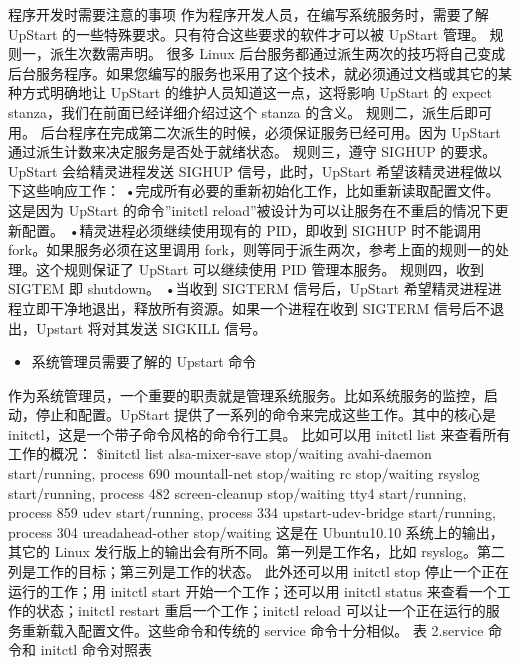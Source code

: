 \documentclass[a4paper,10pt,english]{sphinxmanual}
\begin{document}
程序开发时需要注意的事项
作为程序开发人员，在编写系统服务时，需要了解 UpStart 的一些特殊要求。只有符合这些要求的软件才可以被 UpStart 管理。
规则一，派生次数需声明。
很多 Linux 后台服务都通过派生两次的技巧将自己变成后台服务程序。如果您编写的服务也采用了这个技术，就必须通过文档或其它的某种方式明确地让 UpStart 的维护人员知道这一点，这将影响 UpStart 的 expect stanza，我们在前面已经详细介绍过这个 stanza 的含义。
规则二，派生后即可用。
后台程序在完成第二次派生的时候，必须保证服务已经可用。因为 UpStart 通过派生计数来决定服务是否处于就绪状态。
规则三，遵守 SIGHUP 的要求。
UpStart 会给精灵进程发送 SIGHUP 信号，此时，UpStart 希望该精灵进程做以下这些响应工作：
•完成所有必要的重新初始化工作，比如重新读取配置文件。这是因为 UpStart 的命令”initctl reload”被设计为可以让服务在不重启的情况下更新配置。
•精灵进程必须继续使用现有的 PID，即收到 SIGHUP 时不能调用 fork。如果服务必须在这里调用 fork，则等同于派生两次，参考上面的规则一的处理。这个规则保证了 UpStart 可以继续使用 PID 管理本服务。
规则四，收到 SIGTEM 即 shutdown。
•当收到 SIGTERM 信号后，UpStart 希望精灵进程进程立即干净地退出，释放所有资源。如果一个进程在收到 SIGTERM 信号后不退出，Upstart 将对其发送 SIGKILL 信号。
\begin{itemize}
\item {} 
系统管理员需要了解的 Upstart 命令

\end{itemize}

作为系统管理员，一个重要的职责就是管理系统服务。比如系统服务的监控，启动，停止和配置。UpStart 提供了一系列的命令来完成这些工作。其中的核心是initctl，这是一个带子命令风格的命令行工具。
比如可以用 initctl list 来查看所有工作的概况：
\$initctl list
alsa-mixer-save stop/waiting
avahi-daemon start/running, process 690
mountall-net stop/waiting
rc stop/waiting
rsyslog start/running, process 482
screen-cleanup stop/waiting
tty4 start/running, process 859
udev start/running, process 334
upstart-udev-bridge start/running, process 304
ureadahead-other stop/waiting
这是在 Ubuntu10.10 系统上的输出，其它的 Linux 发行版上的输出会有所不同。第一列是工作名，比如 rsyslog。第二列是工作的目标；第三列是工作的状态。
此外还可以用 initctl stop 停止一个正在运行的工作；用 initctl start 开始一个工作；还可以用 initctl status 来查看一个工作的状态；initctl restart 重启一个工作；initctl reload 可以让一个正在运行的服务重新载入配置文件。这些命令和传统的 service 命令十分相似。
表 2.service 命令和 initctl 命令对照表
\end{document}
